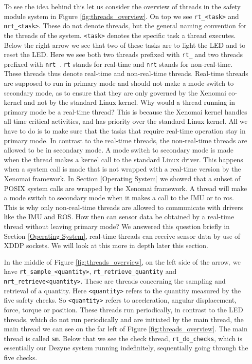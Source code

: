 \documentclass[12pt]{scrreprt}
\begin{document}
To see the idea behind this let us consider the overview of threads in the safety module system in Figure \ref{fig:threads_overview}. On top we see \texttt{rt\_<task>} and \texttt{nrt\_<task>}. These do not denote threads, but the general naming convention for the threads of the system. \texttt{<task>} denotes the specific task a thread executes. Below the right arrow we see that two of these tasks are to light the LED and to reset the LED. Here we see both two threads prefixed with \texttt{rt\_} and two threads prefixed with \texttt{nrt\_}. \texttt{rt} stands for real-time and \texttt{nrt} stands for non-real-time. These threads thus denote real-time and non-real-time threads. Real-time threads are supposed to run in primary mode and should not make a mode switch to secondary mode, as to ensure that they are only governed by the Xenomai co-kernel and not by the standard Linux kernel. Why would a thread running in primary mode be a real-time thread? This is because the Xenomai kernel handles all time critical activities, and has priority over the standard Linux kernel. All we have to do is to make sure that the tasks that require real-time operation stay in primary mode. In contrast to the real-time threads, the non-real-time threads are allowed to be in secondary mode. A mode switch to secondary mode is made when the thread makes a kernel call to the standard Linux driver. This happens when a system call is made that is not wrapped with a real-time version by the Xenomai framework. In Section \ref{Operating System} we showed that a subset of POSIX system calls are wrapped by the Xenomai framework. A thread will make a mode switch to secondary mode when it makes a call to the IMU or to \acrshort{ros}. This is why only non-real-time threads are allowed to communicate with drivers like the IMU and ROS. How then can sensor data be obtained by a real-time thread without leaving primary mode? We answered this question briefly in Section \ref{Operating System}, real-time threads can receive sensor data by use of XDDP sockets. We will look at this more in depth later this section.
\par
In the middle of Figure \ref{fig:threads_overview}, on the left side of the arrow, we have \texttt{rt\_sample\_<quantity>}, \texttt{rt\_retrieve\_quantity} and \texttt{nrt\_retrieve<quantity>}. These are threads concerning the sampling and retrieval of a quantity. Here \texttt{<quantity>} refers to the quantity measured by the five safety checks. So \texttt{<quantity>} refers to acceleration, angular displacement, force, torque or position. These threads run periodically, in contrast to the LED threads, which do not run periodically and are initiated by the main thread, the main thread we can see on the far left of Figure \ref{fig:threads_overview}. The main thread is called \texttt{sm}. Below that we see the check thread, \texttt{rt\_do\_checks}, which is essentially our Dezyne system running indefinitely, sequentially going through the five checks.
\end{document}
